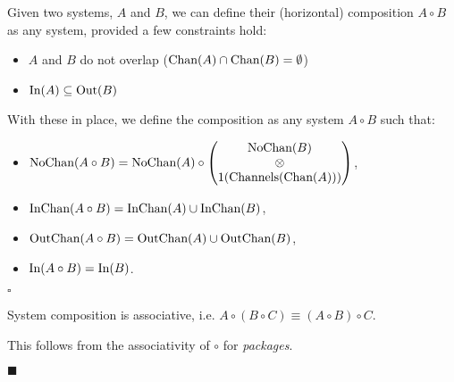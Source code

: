 \begin{definition}
Given two systems, $A$ and $B$, we can define their (horizontal) composition
$A \circ B$ as any system, provided a few constraints hold:
\begin{itemize}
\item $A$ and $B$ do not overlap ($\text{Chan}(A) \cap \text{Chan}(B) = \emptyset$)
\item $\text{In}(A) \subseteq \text{Out}(B)$
\end{itemize}

With these in place, we define the composition as any system $A \circ B$ such that:
\begin{itemize}
  \item $\text{NoChan}(A \circ B) = \text{NoChan}(A) \circ \begin{pmatrix}
    \text{NoChan}(B)\cr
    \otimes\cr
    1(\text{Channels}(\text{Chan}(A)))
  \end{pmatrix}
    $,
  \item $\text{InChan}(A \circ B) = \text{InChan}(A) \cup \text{InChan}(B)$,
  \item $\text{OutChan}(A \circ B) = \text{OutChan}(A) \cup \text{OutChan}(B)$,
  \item $\text{In}(A \circ B) = \text{In}(B)$.
\end{itemize}

$\square$
\end{definition}

\begin{lemma}
System composition is associative, i.e. $A \circ (B \circ C) \equiv (A \circ B) \circ C$.

 This follows from the associativity of $\circ$ for \emph{packages}.

$\blacksquare$
\end{lemma}

